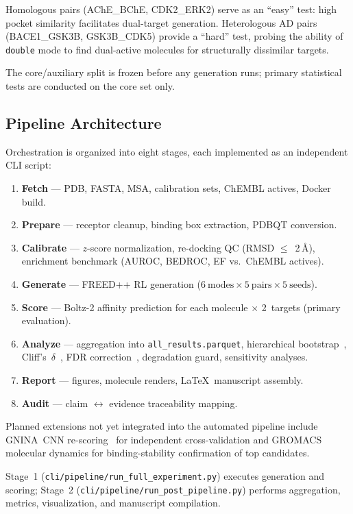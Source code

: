 Homologous pairs (AChE\_BChE, CDK2\_ERK2) serve as an ``easy'' test:
high pocket similarity facilitates dual-target generation.
Heterologous AD pairs (BACE1\_GSK3B, GSK3B\_CDK5) provide a
``hard'' test, probing the ability of \texttt{double} mode to
find dual-active molecules for structurally dissimilar targets.

The core/auxiliary split is frozen before any generation runs;
primary statistical tests are conducted on the core set only.

\subsection{Pipeline Architecture}
\label{sec:methods:pipeline}

Orchestration is organized into eight stages, each implemented
as an independent CLI script:
\begin{enumerate}
\item[0.] \textbf{Fetch} --- PDB, FASTA, MSA, calibration sets, ChEMBL actives, Docker build.
\item[1.] \textbf{Prepare} --- receptor cleanup, binding box extraction, PDBQT conversion.
\item[2.] \textbf{Calibrate} --- $z$-score normalization, re-docking QC (RMSD $\leq$~2\,\AA),
  enrichment benchmark (AUROC, BEDROC, EF vs.\ ChEMBL actives).
\item[3.] \textbf{Generate} --- FREED++ RL generation ($6~\text{modes} \times
  5~\text{pairs} \times 5~\text{seeds}$).
\item[4.] \textbf{Score} --- Boltz-2 affinity prediction for each molecule $\times$
  2~targets (primary evaluation).
\item[5.] \textbf{Analyze} --- aggregation into \texttt{all\_results.parquet},
  hierarchical bootstrap~\citep{cameron2008bootstrap}, Cliff's~$\delta$~\citep{cliff1993dominance},
  FDR correction~\citep{benjamini1995fdr}, degradation guard, sensitivity analyses.
\item[6.] \textbf{Report} --- figures, molecule renders, \LaTeX\ manuscript assembly.
\item[7.] \textbf{Audit} --- claim $\leftrightarrow$ evidence traceability mapping.
\end{enumerate}

Planned extensions not yet integrated into the automated pipeline include
GNINA~CNN re-scoring~\citep{posex2025} for independent cross-validation
and GROMACS molecular dynamics for binding-stability confirmation of
top candidates.

Stage~1 (\texttt{cli/pipeline/run\_full\_experiment.py}) executes
generation and scoring; Stage~2
(\texttt{cli/pipeline/run\_post\_pipeline.py}) performs aggregation,
metrics, visualization, and manuscript compilation.
